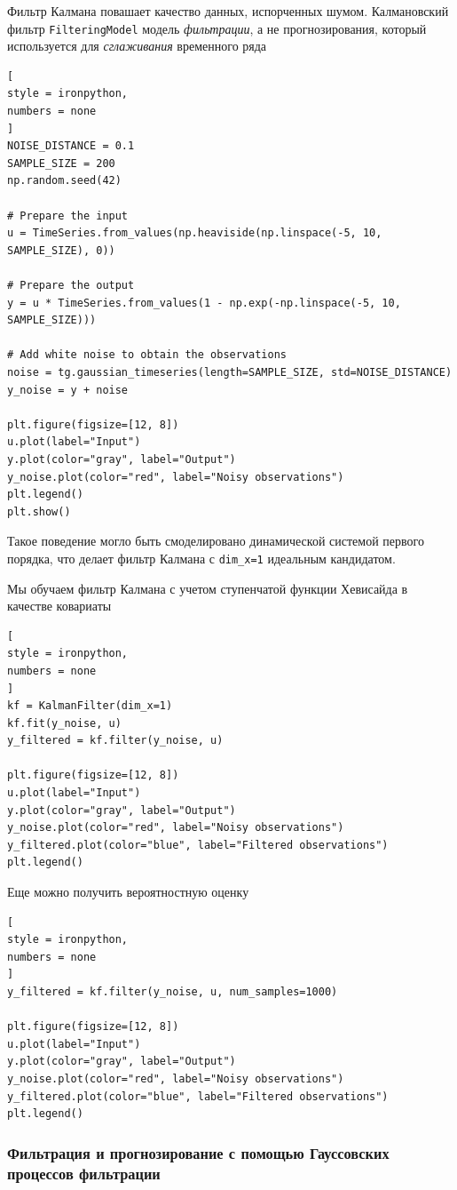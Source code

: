 \documentclass[%
	11pt,
	a4paper,
	utf8,
		]{article}
\begin{document}
Фильтр Калмана повашает качество данных, испорченных шумом. Калмановский фильтр \verb|FilteringModel| модель \emph{фильтрации}, а не прогнозирования, который используется для \emph{сглаживания} временного ряда
\begin{lstlisting}[
style = ironpython,
numbers = none	
]
NOISE_DISTANCE = 0.1
SAMPLE_SIZE = 200
np.random.seed(42)

# Prepare the input
u = TimeSeries.from_values(np.heaviside(np.linspace(-5, 10, SAMPLE_SIZE), 0))

# Prepare the output
y = u * TimeSeries.from_values(1 - np.exp(-np.linspace(-5, 10, SAMPLE_SIZE)))

# Add white noise to obtain the observations
noise = tg.gaussian_timeseries(length=SAMPLE_SIZE, std=NOISE_DISTANCE)
y_noise = y + noise

plt.figure(figsize=[12, 8])
u.plot(label="Input")
y.plot(color="gray", label="Output")
y_noise.plot(color="red", label="Noisy observations")
plt.legend()
plt.show()
\end{lstlisting}

Такое поведение могло быть смоделировано динамической системой первого порядка, что делает фильтр Калмана с \verb|dim_x=1| идеальным кандидатом.

Мы обучаем фильтр Калмана с учетом ступенчатой функции Хевисайда в качестве ковариаты
\begin{lstlisting}[
style = ironpython,
numbers = none
]
kf = KalmanFilter(dim_x=1)
kf.fit(y_noise, u)
y_filtered = kf.filter(y_noise, u)

plt.figure(figsize=[12, 8])
u.plot(label="Input")
y.plot(color="gray", label="Output")
y_noise.plot(color="red", label="Noisy observations")
y_filtered.plot(color="blue", label="Filtered observations")
plt.legend()
\end{lstlisting}

Еще можно получить вероятностную оценку
\begin{lstlisting}[
style = ironpython,
numbers = none
]
y_filtered = kf.filter(y_noise, u, num_samples=1000)

plt.figure(figsize=[12, 8])
u.plot(label="Input")
y.plot(color="gray", label="Output")
y_noise.plot(color="red", label="Noisy observations")
y_filtered.plot(color="blue", label="Filtered observations")
plt.legend()
\end{lstlisting}

\subsubsection{Фильтрация и прогнозирование с помощью Гауссовских процессов фильтрации}
\end{document}
